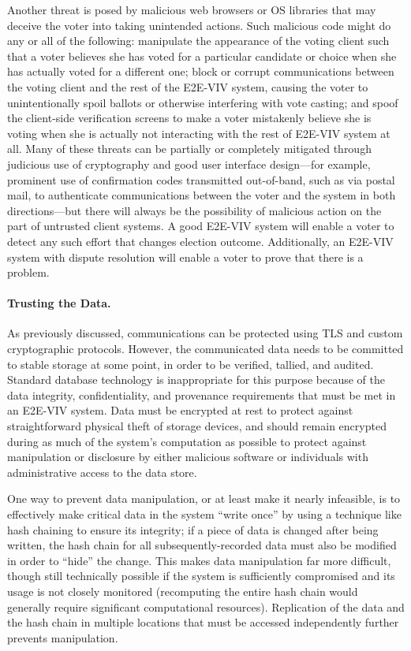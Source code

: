 Another threat is posed by malicious web browsers or OS libraries that
may deceive the voter into taking unintended actions. Such malicious
code might do any or all of the following: manipulate the appearance
of the voting client such that a voter believes she has voted for a
particular candidate or choice when she has actually voted for a
different one; block or corrupt communications between the voting
client and the rest of the E2E-VIV system, causing the voter to
unintentionally spoil ballots or otherwise interfering with vote
casting; and spoof the client-side verification screens to make a
voter mistakenly believe she is voting when she is actually not
interacting with the rest of E2E-VIV system at all. Many of these
threats can be partially or completely mitigated through judicious use
of cryptography and good user interface design---for example,
prominent use of confirmation codes transmitted out-of-band, such as
via postal mail, to authenticate communications between the voter and
the system in both directions---but there will always be the
possibility of malicious action on the part of untrusted client
systems. A good E2E-VIV system will enable a voter to detect any such
effort that changes election outcome. Additionally, an E2E-VIV system
with dispute resolution will enable a voter to prove that there is a
problem.

\paragraph{Trusting the Data.} As previously discussed, communications
can be protected using TLS and custom cryptographic protocols.
However, the communicated data needs to be committed to stable storage
at some point, in order to be verified, tallied, and audited. Standard
database technology is inappropriate for this purpose because of the
data integrity, confidentiality, and provenance requirements that must
be met in an E2E-VIV system. Data must be encrypted at rest to protect
against straightforward physical theft of storage devices, and should
remain encrypted during as much of the system's computation as
possible to protect against manipulation or disclosure by either
malicious software or individuals with administrative access to the
data store.

One way to prevent data manipulation, or at least make it nearly
infeasible, is to effectively make critical data in the system ``write
once'' by using a technique like hash chaining to ensure its
integrity; if a piece of data is changed after being written, the hash
chain for all subsequently-recorded data must also be modified in
order to ``hide'' the change. This makes data manipulation far more
difficult, though still technically possible if the system is
sufficiently compromised and its usage is not closely monitored
(recomputing the entire hash chain would generally require significant
computational resources). Replication of the data and the hash chain
in multiple locations that must be accessed independently further
prevents manipulation.


